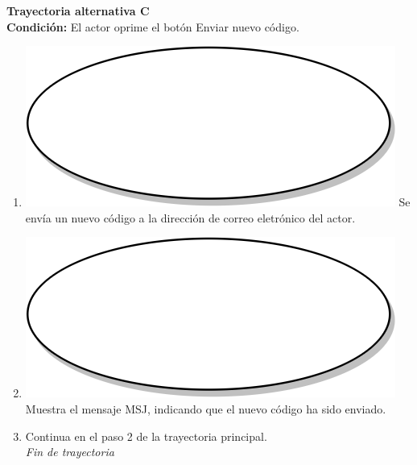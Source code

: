 \textbf{Trayectoria alternativa C} \label{cu2_1_ta_c} \\
\textbf{Condición:} El actor oprime el botón Enviar nuevo código.\\
 \begin{enumerate}[label=\arabic*]
    \item {\includegraphics[scale=.05]{Capitulo3/img/proceso.png} Se envía un nuevo código a la dirección de correo eletrónico del actor.}
    \item {\includegraphics[scale=.05]{Capitulo3/img/proceso.png} Muestra el mensaje MSJ, indicando que el nuevo código ha sido enviado. }
    \item {Continua en el paso 2 de la trayectoria principal.} \\
    \textit{Fin de trayectoria} \\
\end{enumerate}